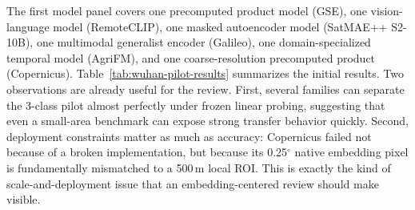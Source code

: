 The first model panel covers one precomputed product model (GSE), one vision-language model (RemoteCLIP), one masked autoencoder model (SatMAE++ S2-10B), one multimodal generalist encoder (Galileo), one domain-specialized temporal model (AgriFM), and one coarse-resolution precomputed product (Copernicus). Table~\ref{tab:wuhan-pilot-results} summarizes the initial results. Two observations are already useful for the review. First, several families can separate the 3-class pilot almost perfectly under frozen linear probing, suggesting that even a small-area benchmark can expose strong transfer behavior quickly. Second, deployment constraints matter as much as accuracy: Copernicus failed not because of a broken implementation, but because its 0.25\(^\circ\) native embedding pixel is fundamentally mismatched to a 500\,m local ROI. This is exactly the kind of scale-and-deployment issue that an embedding-centered review should make visible.


